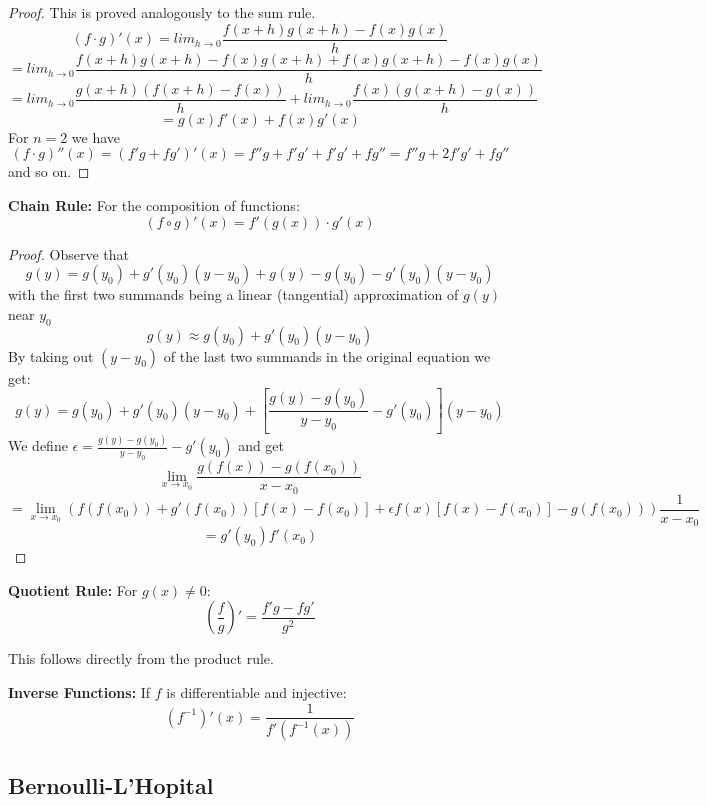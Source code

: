 \begin{proof}
    This is proved analogously to the sum rule.
    $$(f \cdot g)'(x) = lim_{h \to 0} \frac{f(x+h)g(x+h)-f(x)g(x)}{h}$$
    $$ = lim_{h \to 0} \frac{f(x+h)g(x+h)-f(x)g(x+h)+f(x)g(x+h)-f(x)g(x)}{h}$$
    $$ = lim_{h \to 0} \frac{g(x+h)(f(x+h)-f(x))}{h} + lim_{h \to 0} \frac{f(x)(g(x+h)-g(x))}{h}$$
    $$ = g(x)f'(x) + f(x)g'(x)$$
    For $n=2$ we have
    $$(f \cdot g)''(x) = (f'g+fg')'(x) = f''g+f'g'+f'g'+fg'' = f''g+2f'g'+fg''$$
    and so on.
\end{proof}

\begin{theorem}
    \textbf{Chain Rule:} For the composition of functions:
    $$(f \circ g)'(x) = f'(g(x)) \cdot g'(x) $$
\end{theorem}

\begin{proof}
    Observe that 
    $$g(y) = g(y_0) + g'(y_0)(y-y_0) + g(y)-g(y_0)-g'(y_0)(y-y_0)$$
    with the first two summands being a linear (tangential) approximation of $g(y)$ near $y_0$
    $$ g(y) \approx g(y_0) + g'(y_0)(y-y_0)$$ 
    By taking out $(y - y_0)$ of the last two summands in the original equation we get:
    $$g(y) = g(y_0) + g'(y_0)(y-y_0) + \left[\frac{g(y)-g(y_0)}{y-y_0}-g'(y_0)\right](y-y_0)$$
    We define $\epsilon = \frac{g(y)-g(y_0)}{y-y_0}-g'(y_0)$ and get
    $$\lim_{x \to x_0} \frac{g(f(x))-g(f(x_0))}{x-x_0}$$
    $$ = \lim_{x \to x_0} \left(f(f(x_0)) + g'(f(x_0))[f(x)-f(x_0)]+\epsilon f(x)[f(x)-f(x_0)] - g(f(x_0))\right) \frac{1}{x-x_0}$$
    $$ = g'(y_0)f'(x_0)$$
\end{proof}

\begin{theorem}
    \textbf{Quotient Rule:} For $g(x) \neq 0$:
    $$\left(\frac{f}{g}\right)' = \frac{f'g - fg'}{g^2} $$
\end{theorem}

\begin{remark}
    This follows directly from the product rule.
\end{remark}

\begin{theorem}
    \textbf{Inverse Functions:} If $f$ is differentiable and injective:
    $$(f^{-1})'(x) = \frac{1}{f'(f^{-1}(x))} $$
\end{theorem}

\subsection{Bernoulli-L'Hopital}

